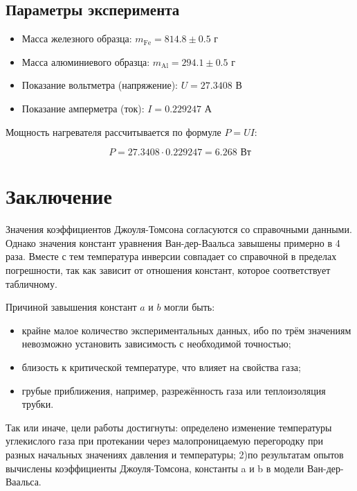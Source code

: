 \documentclass{article}
\begin{document}
	\subsection*{Параметры эксперимента}
	
	\begin{itemize}
		\item Масса железного образца: $m_{\text{Fe}} = 814.8 \pm 0.5$ г
		\item Масса алюминиевого образца: $m_{\text{Al}} = 294.1 \pm 0.5$ г
		\item Показание вольтметра (напряжение): $U = 27.3408$ В
		\item Показание амперметра (ток): $I = 0.229247$ А
	\end{itemize}
	
	Мощность нагревателя рассчитывается по формуле $P = UI$:
	
	\begin{equation}
		P = 27.3408 \cdot 0.229247 = 6.268 \text{ Вт}
	\end{equation}


\section*{Заключение}

\hspace{4mm} Значения коэффициентов Джоуля-Томсона согласуются со справочными данными. Однако значения констант уравнения Ван-дер-Ваальса завышены примерно в 4 раза. Вместе с тем температура инверсии совпадает со справочной в пределах погрешности, так как зависит от отношения констант, которое соответствует табличному. 

Причиной завышения констант $a$ и $b$ могли быть:

\begin{itemize}
	\item крайне малое количество экспериментальных данных, ибо по трём значениям невозможно установить зависимость с необходимой точностью;
	\item близость к критической температуре, что влияет на свойства газа;
	\item грубые приближения, например, разрежённость газа или теплоизоляция трубки.
\end{itemize}

Так или иначе, цели работы достигнуты: определено изменение температуры углекислого газа при протекании через малопроницаемую перегородку при разных начальных значениях давления и температуры; 2)по результатам опытов вычислены коэффициенты Джоуля-Томсона, константы a и b в модели Ван-дер-Ваальса.
\end{document}
